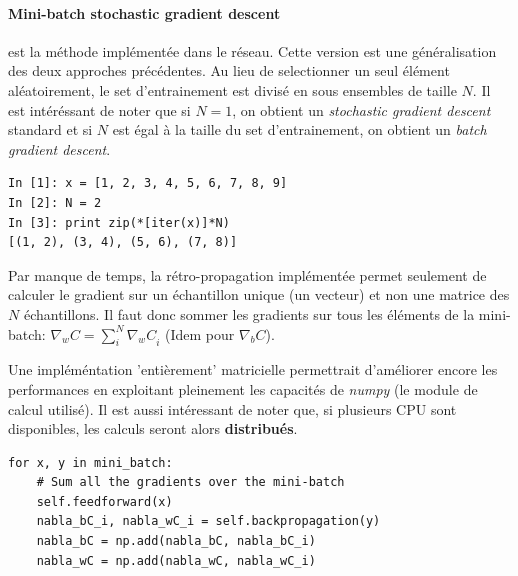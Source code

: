 \documentclass[11pt]{article}
\begin{document}
\paragraph{Mini-batch stochastic gradient descent} est la m\'ethode impl\'ement\'ee
dans le r\'eseau. Cette version est une g\'en\'eralisation des deux approches
pr\'ec\'edentes. Au lieu de selectionner un seul \'el\'ement al\'eatoirement,
le set d'entrainement est divis\'e en sous ensembles de taille $N$. Il est
int\'er\'essant de noter que si $N=1$, on obtient un {\em stochastic gradient descent}
standard et si $N$ est \'egal \`a la taille du set d'entrainement, on obtient un
{\em batch gradient descent}.

\begin{lstlisting}
In [1]: x = [1, 2, 3, 4, 5, 6, 7, 8, 9]
In [2]: N = 2
In [3]: print zip(*[iter(x)]*N)
[(1, 2), (3, 4), (5, 6), (7, 8)]
\end{lstlisting}

Par manque de temps, la r\'etro-propagation impl\'ement\'ee permet seulement de
calculer le gradient sur un \'echantillon unique (un vecteur) et non une matrice
des $N$ \'echantillons. Il faut donc sommer les gradients sur tous les \'el\'ements de
la mini-batch:
$
		\nabla_wC = \sum_{i}^{N}{{\nabla_wC}_i}
$ (Idem pour $\nabla_bC$).

Une impl\'em\'entation 'enti\`erement' matricielle permettrait d'am\'eliorer encore
les performances en exploitant pleinement les capacit\'es de \emph{numpy}
(le module de calcul utilis\'e). Il est aussi int\'eressant de noter que,
si plusieurs CPU sont disponibles, les calculs seront alors {\bf distribu\'es}.
\begin{lstlisting}
for x, y in mini_batch:
	# Sum all the gradients over the mini-batch
	self.feedforward(x)
	nabla_bC_i, nabla_wC_i = self.backpropagation(y)
	nabla_bC = np.add(nabla_bC, nabla_bC_i)
	nabla_wC = np.add(nabla_wC, nabla_wC_i)
\end{lstlisting}

\newpage
\end{document}
